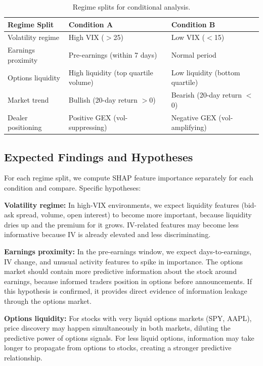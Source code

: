 \documentclass[11pt,a4paper]{article}
\begin{document}
\begin{table}[H]
\centering
\begin{tabularx}{\textwidth}{@{}lXX@{}}
\toprule
\textbf{Regime Split} & \textbf{Condition A} & \textbf{Condition B} \\
\midrule
Volatility regime & High VIX ($>$25) & Low VIX ($<$15) \\
Earnings proximity & Pre-earnings (within 7 days) & Normal period \\
Options liquidity & High liquidity (top quartile volume) & Low liquidity (bottom quartile) \\
Market trend & Bullish (20-day return $>$0) & Bearish (20-day return $<$0) \\
Dealer positioning & Positive GEX (vol-suppressing) & Negative GEX (vol-amplifying) \\
\bottomrule
\end{tabularx}
\caption{Regime splits for conditional analysis.}
\end{table}

\subsection{Expected Findings and Hypotheses}

For each regime split, we compute SHAP feature importance separately for each condition and compare. Specific hypotheses:

\textbf{Volatility regime:} In high-VIX environments, we expect liquidity features (bid-ask spread, volume, open interest) to become more important, because liquidity dries up and the premium for it grows. IV-related features may become less informative because IV is already elevated and less discriminating.

\textbf{Earnings proximity:} In the pre-earnings window, we expect days-to-earnings, IV change, and unusual activity features to spike in importance. The options market should contain more predictive information about the stock around earnings, because informed traders position in options before announcements. If this hypothesis is confirmed, it provides direct evidence of information leakage through the options market.

\textbf{Options liquidity:} For stocks with very liquid options markets (SPY, AAPL), price discovery may happen simultaneously in both markets, diluting the predictive power of options signals. For less liquid options, information may take longer to propagate from options to stocks, creating a stronger predictive relationship.
\end{document}
